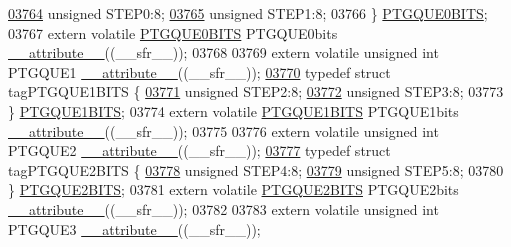 \begin{DoxyCode}
\hypertarget{a00009_source_l03764}{}\hyperlink{a00008_a1fe0ff616ef1e3159f78b8111cd29c14}{03764}   \textcolor{keywordtype}{unsigned} STEP0:8;
\hypertarget{a00009_source_l03765}{}\hyperlink{a00008_a710e326aeb187e647bcd4ad2ed978852}{03765}   \textcolor{keywordtype}{unsigned} STEP1:8;
03766 \} \hyperlink{a00008_df/d46/a00664}{PTGQUE0BITS};
03767 \textcolor{keyword}{extern} \textcolor{keyword}{volatile} \hyperlink{a00008_df/d46/a00664}{PTGQUE0BITS} PTGQUE0bits \hyperlink{a00009_a493c46f03454991ccc5aa7a6e1dfb2a7}{\_\_attribute\_\_}((\_\_sfr\_\_));
03768 
03769 \textcolor{keyword}{extern} \textcolor{keyword}{volatile} \textcolor{keywordtype}{unsigned} \textcolor{keywordtype}{int}  PTGQUE1 \hyperlink{a00009_a493c46f03454991ccc5aa7a6e1dfb2a7}{\_\_attribute\_\_}((\_\_sfr\_\_));
\hypertarget{a00009_source_l03770}{}\hyperlink{a00008}{03770} \textcolor{keyword}{typedef} \textcolor{keyword}{struct }tagPTGQUE1BITS \{
\hypertarget{a00009_source_l03771}{}\hyperlink{a00008_aca9500142aaf3806d63cbe46689b1587}{03771}   \textcolor{keywordtype}{unsigned} STEP2:8;
\hypertarget{a00009_source_l03772}{}\hyperlink{a00008_a03d161459a4f4a6606b268647becc896}{03772}   \textcolor{keywordtype}{unsigned} STEP3:8;
03773 \} \hyperlink{a00008_da/d46/a00665}{PTGQUE1BITS};
03774 \textcolor{keyword}{extern} \textcolor{keyword}{volatile} \hyperlink{a00008_da/d46/a00665}{PTGQUE1BITS} PTGQUE1bits \hyperlink{a00009_a493c46f03454991ccc5aa7a6e1dfb2a7}{\_\_attribute\_\_}((\_\_sfr\_\_));
03775 
03776 \textcolor{keyword}{extern} \textcolor{keyword}{volatile} \textcolor{keywordtype}{unsigned} \textcolor{keywordtype}{int}  PTGQUE2 \hyperlink{a00009_a493c46f03454991ccc5aa7a6e1dfb2a7}{\_\_attribute\_\_}((\_\_sfr\_\_));
\hypertarget{a00009_source_l03777}{}\hyperlink{a00008}{03777} \textcolor{keyword}{typedef} \textcolor{keyword}{struct }tagPTGQUE2BITS \{
\hypertarget{a00009_source_l03778}{}\hyperlink{a00008_ace6f970f30e4d726b8d4499699405132}{03778}   \textcolor{keywordtype}{unsigned} STEP4:8;
\hypertarget{a00009_source_l03779}{}\hyperlink{a00008_a77411fdbb7bd3b22af9293b198b06508}{03779}   \textcolor{keywordtype}{unsigned} STEP5:8;
03780 \} \hyperlink{a00008_d9/d41/a00666}{PTGQUE2BITS};
03781 \textcolor{keyword}{extern} \textcolor{keyword}{volatile} \hyperlink{a00008_d9/d41/a00666}{PTGQUE2BITS} PTGQUE2bits \hyperlink{a00009_a493c46f03454991ccc5aa7a6e1dfb2a7}{\_\_attribute\_\_}((\_\_sfr\_\_));
03782 
03783 \textcolor{keyword}{extern} \textcolor{keyword}{volatile} \textcolor{keywordtype}{unsigned} \textcolor{keywordtype}{int}  PTGQUE3 \hyperlink{a00009_a493c46f03454991ccc5aa7a6e1dfb2a7}{\_\_attribute\_\_}((\_\_sfr\_\_));

\end{DoxyCode}
